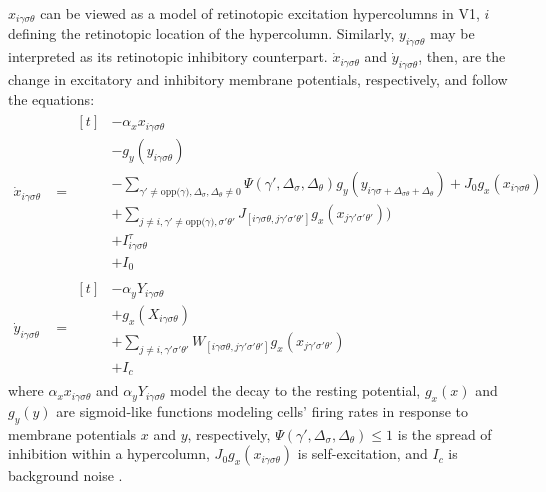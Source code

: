 \documentclass[journal,onecolumn]{IEEEtran}
\begin{document}
$x_{i\gamma\sigma\theta}$ can be viewed as a model of retinotopic excitation hypercolumns in V1, $i$ defining the retinotopic location of the hypercolumn. Similarly, $y_{i\gamma\sigma\theta}$ may be interpreted as its retinotopic inhibitory counterpart. $\dot{x}_{i\gamma\sigma\theta}$ and $\dot{y}_{i\gamma\sigma\theta}$, then, are the change in excitatory and inhibitory membrane potentials, respectively, and follow the equations:
\begin{align}
    \dot{x}_{i\gamma\sigma\theta} &= \begin{aligned}[t]
        & - \alpha_{x}x_{i\gamma\sigma\theta} \label{eq:delta-x} \\
        & - g_y(y_{i\gamma\sigma\theta}) \\
        & - \sum\nolimits_{\gamma' \neq \text{opp($\gamma$)},\Delta_{\sigma},\Delta_{\theta} \neq 0}
            \Psi(\gamma',\Delta_{\sigma},\Delta_{\theta})
            g_y(y_{i\gamma\sigma + \Delta_{\sigma\theta} + \Delta_{\theta}})
            + J_0g_x(x_{i\gamma\sigma\theta}) \\
        & + \sum\nolimits_{j \neq i,\gamma' \neq \text{opp($\gamma$)},\sigma'\theta'}
            J_{[i\gamma\sigma\theta, j\gamma'\sigma'\theta']}g_x(x_{j\gamma'\sigma'\theta'})) \\
        & + I^\tau_{i\gamma\sigma\theta} \\
        & + I_0
        \end{aligned} \\
    \dot{y}_{i\gamma\sigma\theta} &= \begin{aligned}[t]
        & - \alpha_{y}Y_{i\gamma\sigma\theta} \label{eq:delta-y} \\
        & + g_x(X_{i\gamma\sigma\theta}) \\
        & + \sum\nolimits_{j \neq i, \gamma'\sigma'\theta'}
            W_{[i\gamma\sigma\theta, j\gamma'\sigma'\theta']}g_x(x_{j\gamma'\sigma'\theta'}) \\
        & + I_{c}
       \end{aligned}
\end{align}
where $\alpha_{x}x_{i\gamma\sigma\theta}$ and $\alpha_{y}Y_{i\gamma\sigma\theta}$ model the decay to the resting potential, $g_x(x)$ and $g_y(y)$ are sigmoid-like functions modeling cells' firing rates in response to membrane potentials $x$ and $y$, respectively, $\Psi(\gamma',\Delta_{\sigma},\Delta_{\theta}) \leq 1$ is the spread of inhibition within a hypercolumn, $J_0g_x(x_{i\gamma\sigma\theta})$ is self-excitation, and $I_c$ is background noise \cite{li:1999}.
\end{document}
